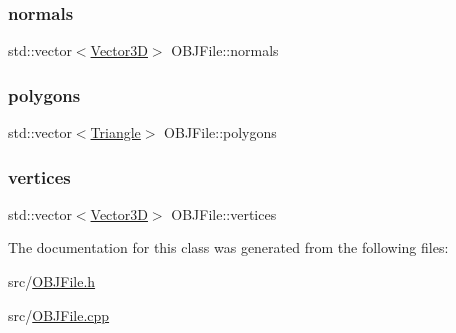 \mbox{\label{classOBJFile_a287bef6fc146d20df4585d103b226eec}} 
\subsubsection{\texorpdfstring{normals}{normals}}
{\footnotesize\ttfamily std\+::vector$<$\mbox{\hyperlink{classVector3D}{Vector3D}}$>$ O\+B\+J\+File\+::normals\hspace{0.3cm}{\ttfamily [private]}}

\mbox{\label{classOBJFile_a7d568b98c43fd96142d9f0f0e57b296e}} 
\subsubsection{\texorpdfstring{polygons}{polygons}}
{\footnotesize\ttfamily std\+::vector$<$\mbox{\hyperlink{classTriangle}{Triangle}}$>$ O\+B\+J\+File\+::polygons\hspace{0.3cm}{\ttfamily [private]}}

\mbox{\label{classOBJFile_a9b07010eef35e7d44250f5f4f8fa3428}} 
\subsubsection{\texorpdfstring{vertices}{vertices}}
{\footnotesize\ttfamily std\+::vector$<$\mbox{\hyperlink{classVector3D}{Vector3D}}$>$ O\+B\+J\+File\+::vertices\hspace{0.3cm}{\ttfamily [private]}}



The documentation for this class was generated from the following files\+:\begin{DoxyCompactItemize}
\item 
src/\mbox{\hyperlink{OBJFile_8h}{O\+B\+J\+File.\+h}}\item 
src/\mbox{\hyperlink{OBJFile_8cpp}{O\+B\+J\+File.\+cpp}}\end{DoxyCompactItemize}
